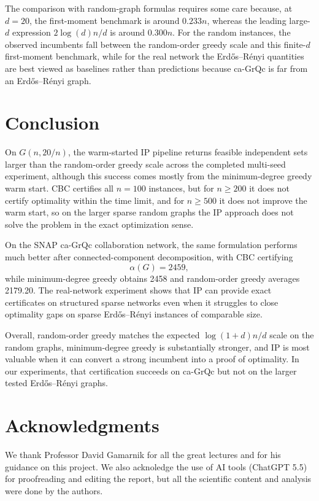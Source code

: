 \documentclass[11pt]{article}
\begin{document}
The comparison with random-graph formulas requires some care because, at
$d=20$, the first-moment benchmark is around $0.233n$, whereas the leading
large-$d$ expression $2\log(d)n/d$ is around $0.300n$.  For the random
instances, the observed incumbents fall between the random-order greedy scale
and this finite-$d$ first-moment benchmark, while for the real network the
Erdős--Rényi quantities are best viewed as baselines rather than predictions
because ca-GrQc is far from an Erdős--Rényi graph.

\section{Conclusion}

On $G(n,20/n)$, the warm-started IP pipeline returns feasible independent sets
larger than the random-order greedy scale across the completed multi-seed
experiment, although this success comes mostly from the minimum-degree greedy
warm start.  CBC certifies all $n=100$ instances, but for $n\ge 200$ it does not certify
optimality within the time limit, and for $n\ge 500$ it does not improve the
warm start, so on the larger sparse random graphs the IP approach does not
solve the problem in the exact optimization sense.

On the SNAP ca-GrQc collaboration network, the same formulation performs much
better after connected-component decomposition, with CBC certifying
\[
\alpha(G)=2459,
\]
while minimum-degree greedy obtains 2458 and random-order greedy averages
2179.20.  The real-network experiment shows that IP can provide exact
certificates on structured sparse networks even when it struggles to close
optimality gaps on sparse Erdős--Rényi instances of comparable size.

Overall, random-order greedy matches the expected $\log(1+d)n/d$ scale on the
random graphs, minimum-degree greedy is substantially stronger, and IP is most
valuable when it can convert a strong incumbent into a proof of optimality.  In
our experiments, that certification succeeds on ca-GrQc but not on the larger
tested Erdős--Rényi graphs.

\section*{Acknowledgments}

We thank Professor David Gamarnik for all the great lectures and for his guidance on this project. We also acknoledge the use of AI tools (ChatGPT 5.5) for proofreading and editing the report, but all the scientific content and analysis were done by the authors.
\end{document}
